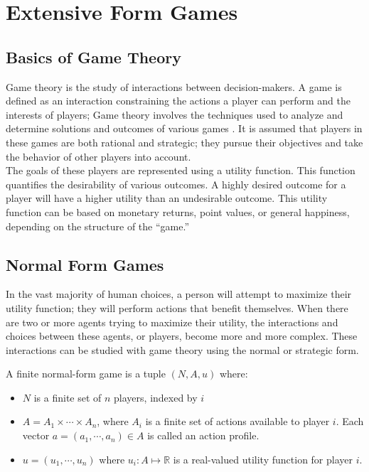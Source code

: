 \chapter{Extensive Form Games}
\section{Basics of Game Theory}
Game theory is the study of interactions between decision-makers. A game is defined as an interaction constraining the actions a player can perform and the interests of players; Game theory involves the techniques used to analyze and determine solutions and outcomes of various games \cite{osbo94}. It is assumed that players in these games are both rational and strategic; they pursue their objectives and take the behavior of other players into account.\\

The goals of these players are represented using a utility function. This function quantifies the desirability of various outcomes. A highly desired outcome for a player will have a higher utility than an undesirable outcome. This utility function can be based on monetary returns, point values, or general happiness, depending on the structure of the ``game.''
\section{Normal Form Games}
In the vast majority of human choices, a person will attempt to maximize their utility function; they will perform actions that benefit themselves. When there are two or more agents trying to maximize their utility, the interactions and choices between these agents, or players, become more and more complex. These interactions can be studied with game theory using the normal or strategic form.
\begin{define}
  A finite normal-form game is a tuple $(N, A, u)$ where:
  \begin{itemize}
  \item $N$ is a finite set of $n$ players, indexed by $i$
  \item $A=A_1\times\cdots\times A_n$, where $A_i$ is a finite set of actions available to player $i$. Each vector $a=(a_1,\cdots ,a_n)\in A$ is called an action profile.
    \item $u=(u_1,\cdots ,u_n)$ where $u_i : A \mapsto\mathbb{R}$ is a real-valued utility function for player $i$.
\end{itemize}
\end{define}

